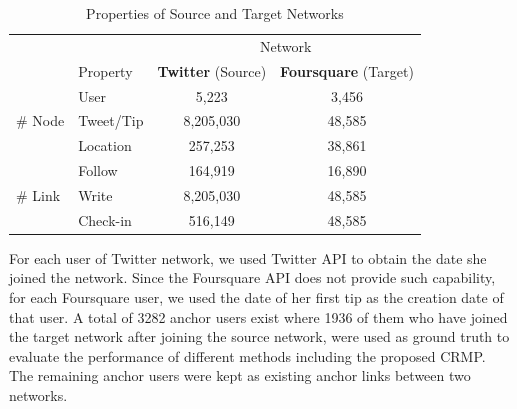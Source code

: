 \documentclass[conference]{IEEEtran}
\begin{document}
\begin{table}
\centering
\caption{Properties of Source and Target Networks}
\label{table:dataset}
\begin{tabular}{l l c c}
\toprule
& & \multicolumn{2}{c}{Network} \\
\cmidrule(l){3-4}
& Property & \textbf{Twitter} (Source) & \textbf{Foursquare} (Target)\\
\midrule %
& User & 5,223 & 3,456 \\ %
\# Node & Tweet/Tip & 8,205,030 & 48,585 \\ %
& Location & 257,253 & 38,861 \\ %
\midrule
& Follow & 164,919 & 16,890 \\ %
\# Link & Write & 8,205,030 & 48,585 \\ %
& Check-in & 516,149 & 48,585 \\ %
\bottomrule %
\end{tabular}
\end{table}

For each user of Twitter network, we used Twitter API to obtain the date she joined the network. Since the Foursquare API does not provide such capability, for each Foursquare user, we used the date of her first tip as the creation date of that user. A total of 3282 anchor users exist where 1936 of them who have joined the target network after joining the source network, were used as ground truth to evaluate the performance of different methods including the proposed CRMP. The remaining anchor users were kept as existing anchor links between two networks.

\newcommand{\hetplot}[1]{
\begin{tikzpicture}
\begin{axis}
[
ybar,
tiny,
width=1.9in,
enlarge x limits=0.4,
bar width=0.07in,
legend style={at={(0.5,1.3)},
anchor=north,legend columns=-1, draw=none},
symbolic x coords={CMP, RMP, CRMP, CICF},
xtick=data,
ymin=0.4,
ymajorgrids,
y tick label style={
/pgf/number format/.cd,
fixed,
fixed zerofill,
precision=2,
/tikz/.cd
},
]
\addplot+[
fill=orange,
draw=red,
error bars/.cd,y dir=both,y explicit,error mark=.] table[x=Method,y=Value, y error=Error] {results/het-#1-sc.dat};
\addplot+[
fill=cyan,
draw=blue,
error bars/.cd,y dir=both,y explicit,error mark=.] table[x=Method,y=Value, y error=Error] {results/het-#1-sc-sp-tp-tx.dat};
\legend{Homogeneous, Heterogeneous}
\end{axis}
\end{tikzpicture}
}
\end{document}
